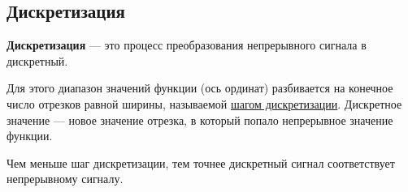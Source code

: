 \documentclass[a4paper, 12pt]{article}
\begin{document}
\subsection{Дискретизация}

\textbf{Дискретизация} --- это процесс преобразования непрерывного сигнала
в дискретный.

Для этого диапазон значений функции (ось ординат) разбивается на конечное
число отрезков равной ширины, называемой \underline{шагом дискретизации}.
Дискретное значение --- новое значение отрезка, в который попало непрерывное
значение функции. %

Чем меньше шаг дискретизации, тем точнее дискретный сигнал соответствует
непрерывному сигналу. %
\end{document}
